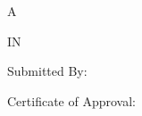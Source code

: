 %
%
%


\providecommand{\tabularnewline}{\\}

\begin{titlepage}
\begin{center}

\begin{singlespace}
\MakeUppercase{\pvamucollege}

\vspace{10 mm}
\textbf{\MakeUppercase{\pvamumanuscripttitle}}

\vspace{5 mm}
A \pvamupapertype

\pvamusubmitto

\vspace{5 mm}
\MakeUppercase{\pvamudegree}

IN

\MakeUppercase{\pvamumajor}

\vspace{10 mm}
\end{singlespace}

Submitted By:\\
\textbf{\MakeUppercase{\pvamufullname}}

\vspace{10 mm}
\par\end{center}

\begin{singlespace}
Certificate of Approval:


\end{singlespace}
\end{titlepage}
